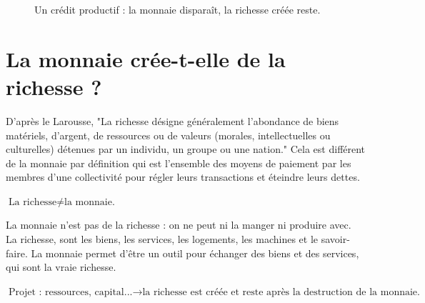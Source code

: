 \documentclass[11pt,a4paper]{article}
\begin{document}
\begin{figure}[H]
\centering
{}
\caption{Un crédit productif : la monnaie disparaît, la richesse créée reste.}
\label{fig:boulangerie}
\end{figure}



\section{La monnaie crée-t-elle de la richesse ?}

D'après le Larousse, "La richesse désigne généralement l'abondance de biens matériels, d'argent, de ressources ou de valeurs (morales, intellectuelles ou culturelles) détenues par un individu, un groupe ou une nation."
Cela est différent de la monnaie par définition qui est l'ensemble des moyens de paiement par les membres d'une collectivité pour régler leurs transactions et éteindre leurs dettes.

$\text{La richesse} \neq \text{la monnaie.}$

La monnaie n'est pas de la richesse : on ne peut ni la manger ni produire avec. La richesse, sont les biens, les services, les logements, les machines et le savoir-faire. La monnaie permet d'être un outil pour échanger des biens et des services, qui sont la vraie richesse.


$\text{Projet : ressources, capital...} \rightarrow \text{la richesse est créée et reste après la destruction de la monnaie.}$
\end{document}
